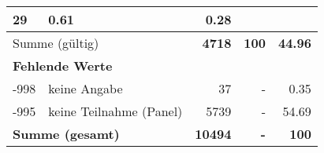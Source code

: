 \begin{longtable}{lXrrr}
       \num{29} &
       \num[round-mode=places,round-precision=2]{0,61} &
         \num[round-mode=places,round-precision=2]{0,28} \\
     \midrule
     \multicolumn{2}{l}{Summe (gültig)} &
       \textbf{\num{4718}} &
     \textbf{100} &
       \textbf{\num[round-mode=places,round-precision=2]{44,96}} \\
     \multicolumn{5}{l}{\textbf{Fehlende Werte}}\\
       -998 &
       keine Angabe &
         \num{37} &
        - &
         \num[round-mode=places,round-precision=2]{0,35} \\
       -995 &
       keine Teilnahme (Panel) &
         \num{5739} &
        - &
         \num[round-mode=places,round-precision=2]{54,69} \\
     \midrule
     \multicolumn{2}{l}{\textbf{Summe (gesamt)}} &
          \textbf{\num{10494}} &
        \textbf{-} &
        \textbf{100} \\
     \bottomrule
     \end{longtable}
     
